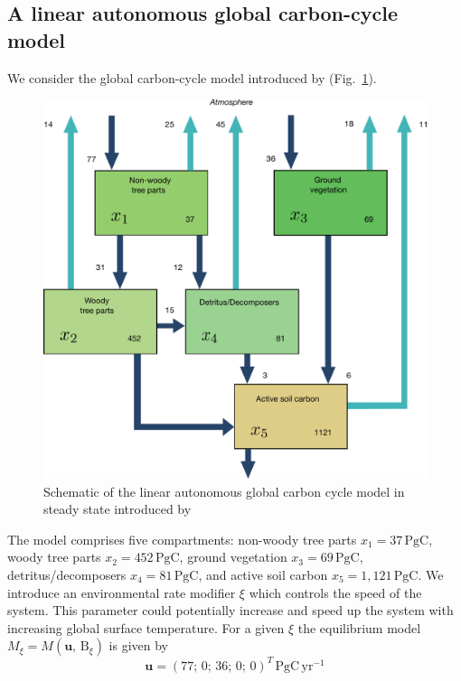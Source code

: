 \documentclass[smallextended]{svjour3}
\renewcommand{\tens}[1]{\mathrm{#1}}
\renewcommand{\vec}[1]{\mathbf{#1}}
\newcommand{\peta}{\mathrm{P}}
\newcommand{\gC}{\mathrm{gC}}
\newcommand{\yr}{\mathrm{yr}}
\newcommand{\transpose}{T}
\begin{document}
\subsection{A linear autonomous global carbon-cycle model}
\label{sec:example_1}
We consider the global carbon-cycle model introduced by \citet{Emanuel1981} (Fig.~\ref{fig:Emanuel_model}).
\begin{figure}[htbp]
  \centering
  \includegraphics[width=0.5\linewidth]{figs/EmanuelModelStructure.pdf}
  \caption{Schematic of the linear autonomous global carbon cycle model in steady state introduced by \citet{Emanuel1981}
  }
  \label{fig:Emanuel_model}
\end{figure}
The model comprises five compartments: non-woody tree parts $x_1=37\,\peta\gC$, woody tree parts $x_2=452\,\peta\gC$, ground vegetation $x_3=69\,\peta\gC$, detritus/decomposers $x_4=81\,\peta\gC$, and active soil carbon $x_5=1,121\,\peta\gC$.
We introduce an environmental rate modifier $\xi$ which controls the speed of the system.
This parameter could potentially increase and speed up the system with increasing global surface temperature.
For a given $\xi$ the equilibrium model $M_\xi=M(\vec{u},\,\tens{B}_\xi)$ is given by
\begin{equation}
  \vec{u} = (77;\,0;\,36;\,0;\,0)^{\transpose}\, \peta\gC\,\yr^{-1}
\end{equation}
\end{document}

